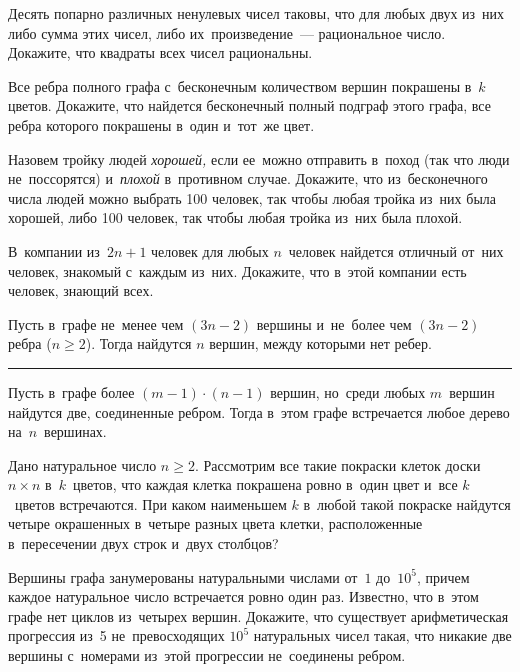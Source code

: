 \begin{problems}

\item
Десять попарно различных ненулевых чисел таковы, что для любых двух из~них либо
сумма этих чисел, либо их~произведение~— рациональное число.
Докажите, что квадраты всех чисел рациональны.

\item
Все ребра полного графа с~бесконечным количеством вершин покрашены
в~$k$ цветов.
Докажите, что найдется бесконечный полный подграф этого графа, все ребра
которого покрашены в~один и~тот~же цвет.

\item
Назовем тройку людей \emph{хорошей,} если ее~можно отправить в~поход
(так что люди не~поссорятся) и~\emph{плохой} в~противном случае.
Докажите, что из~бесконечного числа людей можно выбрать 100 человек, так чтобы
любая тройка из~них была хорошей, либо 100 человек, так чтобы любая тройка
из~них была плохой.

\item
В~компании из~$2 n + 1$ человек для любых $n$~человек найдется отличный от~них
человек, знакомый с~каждым из~них.
Докажите, что в~этой компании есть человек, знающий всех.

\item
Пусть в~графе не~менее чем $(3 n - 2)$ вершины и~не~более чем $(3 n - 2)$ ребра
($n \geq 2$).
Тогда найдутся $n$ вершин, между которыми нет ребер.

\end{problems}

\medskip
\hrule

\begin{problems}

\item
Пусть в~графе более $(m - 1) \cdot (n - 1)$ вершин, но~среди любых $m$~вершин
найдутся две, соединенные ребром.
Тогда в~этом графе встречается любое дерево на~$n$~вершинах.

\item
Дано натуральное число $n \geq 2$.
Рассмотрим все такие покраски клеток доски $n \times n$ в~$k$~цветов, что
каждая клетка покрашена ровно в~один цвет и~все $k$~цветов встречаются.
При каком наименьшем $k$ в~любой такой покраске найдутся четыре окрашенных
в~четыре разных цвета клетки, расположенные в~пересечении двух строк и~двух
столбцов?

\item
Вершины графа занумерованы натуральными числами от~$1$ до~$10^5$, причем каждое
натуральное число встречается ровно один раз.
Известно, что в~этом графе нет циклов из~четырех вершин.
Докажите, что существует арифметическая прогрессия из~5 не~превосходящих $10^5$
натуральных чисел такая, что никакие две вершины с~номерами из~этой прогрессии
не~соединены ребром.

\end{problems}

